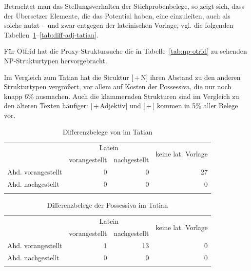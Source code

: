 Betrachtet man das Stellungsverhalten der Stichprobenbelege, so zeigt sich, dass der Übersetzer Elemente, die das Potential haben, eine  einzuleiten, auch als solche nutzt -- und zwar entgegen der lateinischen Vorlage, vgl. die folgenden Tabellen~\ref{tab:diff-ther-tatian}--\ref{tab:diff-adj-tatian}.  



Für Otfrid hat die Proxy-Struktursuche  die in Tabelle~\ref{tab:np-otrid}  zu sehenden NP-Strukturtypen hervorgebracht.

Im Vergleich zum Tatian hat die Struktur [\,+\,N] ihren Abstand zu den anderen Strukturtypen vergrößert, vor allem auf Kosten der  Possessiva, die nur noch knapp 6\% ausmachen. Auch die klammernden Strukturen  sind im Vergleich zu den älteren Texten häufiger: [\,+\,Adjektiv]  und [\,+\,] kommen in 5\% aller Belege vor. 

\begin{table}[H]
\centering
\begin{tabular}{lrrr}
\lsptoprule
& \multicolumn{2}{c}{Latein} & \multirow{2}{*}{keine lat. Vorlage}\\
 \cmidrule(lr){2-3}
                   & vorangestellt & nachgestellt & \\ \midrule
Ahd. vorangestellt & 0                  & 0                 & 27                    \\
Ahd. nachgestellt  & 0                  & 0                 & 0                    \\ \lspbottomrule
\end{tabular}
\caption{Differenzbelege  von  im Tatian}
\label{tab:diff-ther-tatian}
\end{table}

\begin{table}[H]
\centering
\begin{tabular}{lrrr}
\lsptoprule
                   & \multicolumn{2}{c}{Latein} & \multirow{2}{*}{keine lat. Vorlage}\\
 \cmidrule(lr){2-3}
                   & vorangestellt & nachgestellt & \\ \midrule
Ahd. vorangestellt & 1                  & 13                 & 0                    \\
Ahd. nachgestellt  & 0                  & 0                 & 0                    \\ \lspbottomrule
\end{tabular}
\caption{Differenzbelege der Possessiva  im Tatian}
\label{tab:diff-poss-tatian}
\end{table}


